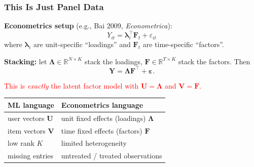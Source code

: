 \documentclass[notes,11pt, aspectratio=169]{beamer}
\newcommand{\vU}{\mathbf{U}}
\newcommand{\vV}{\mathbf{V}}
\newcommand{\vY}{\mathbf{Y}}
\newcommand{\R}{\mathbb{R}}
\begin{document}

\begin{frame}
\frametitle{This Is Just Panel Data}

\textbf{Econometrics setup} (e.g., Bai 2009, \emph{Econometrica}):
\[
    Y_{it} = \boldsymbol\lambda_i^\top \mathbf{F}_t + \varepsilon_{it}
\]
where $\boldsymbol\lambda_i$ are unit-specific ``loadings'' and $\mathbf{F}_t$ are time-specific ``factors''.

\vspace{6pt}
\textbf{Stacking:} let $\boldsymbol\Lambda \in \R^{N \times K}$ stack the loadings, $\mathbf{F} \in \R^{T \times K}$ stack the factors. Then
\[
    \vY = \boldsymbol\Lambda \mathbf{F}^\top + \boldsymbol\varepsilon.
\]

\vspace{6pt}
\textcolor{red}{This is \emph{exactly} the latent factor model with $\vU = \boldsymbol\Lambda$ and $\vV = \mathbf{F}$.}

\vspace{8pt}
\begin{tabular}{ll}
\toprule
\textbf{ML language} & \textbf{Econometrics language} \\
\midrule
user vectors $\vU$ & unit fixed effects (loadings) $\boldsymbol\Lambda$ \\
item vectors $\vV$ & time fixed effects (factors) $\mathbf{F}$ \\
low rank $K$ & limited heterogeneity \\
missing entries & untreated / treated observations \\
\bottomrule
\end{tabular}
\end{frame}
\end{document}

